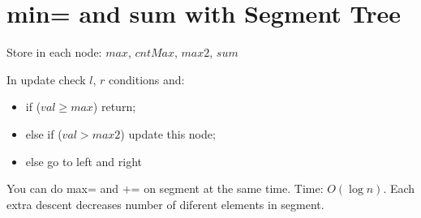 \section*{min= and sum with Segment Tree}

Store in each node: $max$, $cntMax$, $max2$, $sum$

In update check $l$, $r$ conditions and: 
\begin{itemize}
\item if ($val \ge max$) return;
\item else if ($val > max2$) update this node;
\item else go to left and right
\end{itemize}

You can do max= and += on segment at the same time.
Time: $O(\log n)$. Each extra descent decreases number of diferent elements in segment. 
